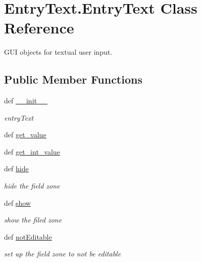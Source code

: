 \hypertarget{classEntryText_1_1EntryText}{\section{Entry\+Text.\+Entry\+Text Class Reference}
\label{classEntryText_1_1EntryText}
}


G\+U\+I objects for textual user input.  


\subsection*{Public Member Functions}
\begin{DoxyCompactItemize}
\item 
def \hyperlink{classEntryText_1_1EntryText_aa0f480a8a293253cba3ab545485a6a2e}{\+\_\+\+\_\+init\+\_\+\+\_\+}
\begin{DoxyCompactList}\small\item\em entry\+Text \end{DoxyCompactList}\item 
def \hyperlink{classEntryText_1_1EntryText_a3432cdd965ef000086cef763c25f31ca}{get\+\_\+value}
\item 
def \hyperlink{classEntryText_1_1EntryText_a8ba228c1c2d6781dd3b54a09077593e9}{get\+\_\+int\+\_\+value}
\item 
\hypertarget{classEntryText_1_1EntryText_ad3c9ab45f744dcc7f84800c668a9e923}{def \hyperlink{classEntryText_1_1EntryText_ad3c9ab45f744dcc7f84800c668a9e923}{hide}}\label{classEntryText_1_1EntryText_ad3c9ab45f744dcc7f84800c668a9e923}

\begin{DoxyCompactList}\small\item\em hide the field zone \end{DoxyCompactList}\item 
\hypertarget{classEntryText_1_1EntryText_aa4c65a1d0aa22b2d651196b3d1a19be8}{def \hyperlink{classEntryText_1_1EntryText_aa4c65a1d0aa22b2d651196b3d1a19be8}{show}}\label{classEntryText_1_1EntryText_aa4c65a1d0aa22b2d651196b3d1a19be8}

\begin{DoxyCompactList}\small\item\em show the filed zone \end{DoxyCompactList}\item 
\hypertarget{classEntryText_1_1EntryText_a8b6dacde8710e613f48006c287ea1bde}{def \hyperlink{classEntryText_1_1EntryText_a8b6dacde8710e613f48006c287ea1bde}{not\+Editable}}\label{classEntryText_1_1EntryText_a8b6dacde8710e613f48006c287ea1bde}

\begin{DoxyCompactList}\small\item\em set up the field zone to not be editable \end{DoxyCompactList}\end{DoxyCompactItemize}
